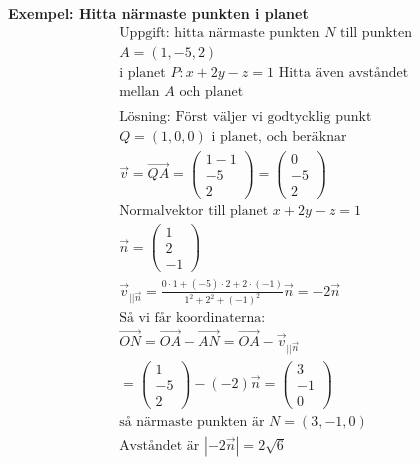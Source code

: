 \begin{multicols}{2}
\textbf{Exempel: Hitta närmaste punkten i planet} %
\begin{align*}
  &\text{Uppgift: hitta närmaste punkten $N$ till punkten} \\
  &A = (1,-5,2) \\
  &\text{i planet } P: x+2y-z=1 \text{ Hitta även avståndet} \\
  &\text{mellan $A$ och planet} \\
  &\\
  &\text{Lösning: Först väljer vi godtycklig punkt } \\
  &Q=(1,0,0) \text{ i planet, och beräknar} \\
  &\vec{v}=\overrightarrow{QA} =
  \begin{pmatrix} 1-1 \\ -5 \\ 2 \end{pmatrix} =
  \begin{pmatrix} 0 \\ -5 \\ 2 \end{pmatrix} \\
  &\text{Normalvektor till planet } x+2y-z=1 \\
  &\vec{n} = \begin{pmatrix} 1 \\ 2 \\ -1 \end{pmatrix} \\
  &\vec{v}_{||\vec{n}} = \frac{0\cdot{1}+(-5)\cdot{2}+2\cdot{(-1)}}{1^2+2^2+{(-1)}^2}\vec{n}
  = -2\vec{n} \\
  &\text{Så vi får koordinaterna: } \\
  &\overrightarrow{ON} = \overrightarrow{OA} - \overrightarrow{AN}
  = \overrightarrow{OA}-\vec{v}_{||\vec{n}} \\
  &=\begin{pmatrix} 1 \\ -5 \\ 2 \end{pmatrix} - (-2)\vec{n} =
  \begin{pmatrix} 3 \\ -1 \\ 0 \end{pmatrix} \\
  &\text{så närmaste punkten är } N = (3,-1,0) \\
  &\text{Avståndet är } |-2\vec{n}| = 2\sqrt{6} \\
\end{align*}


\end{multicols}
